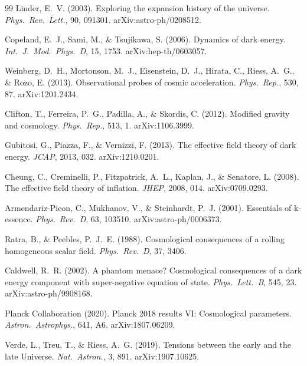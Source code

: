 \documentclass[12pt,a4paper]{article}
\begin{document}
\begin{thebibliography}{99}
  Linder, E.~V. (2003).
  Exploring the expansion history of the universe.
  \textit{Phys.\ Rev.\ Lett.}, 90, 091301.
  arXiv:astro-ph/0208512.

  Copeland, E.~J., Sami, M., \& Tsujikawa, S. (2006).
  Dynamics of dark energy.
  \textit{Int.\ J.\ Mod.\ Phys.\ D}, 15, 1753.
  arXiv:hep-th/0603057.

  Weinberg, D.~H., Mortonson, M.~J., Eisenstein, D.~J., Hirata, C.,
  Riess, A.~G., \& Rozo, E. (2013).
  Observational probes of cosmic acceleration.
  \textit{Phys.\ Rep.}, 530, 87.
  arXiv:1201.2434.

  Clifton, T., Ferreira, P.~G., Padilla, A., \& Skordis, C. (2012).
  Modified gravity and cosmology.
  \textit{Phys.\ Rep.}, 513, 1.
  arXiv:1106.3999.

  Gubitosi, G., Piazza, F., \& Vernizzi, F. (2013).
  The effective field theory of dark energy.
  \textit{JCAP}, 2013, 032.
  arXiv:1210.0201.

  Cheung, C., Creminelli, P., Fitzpatrick, A.~L., Kaplan, J., \& Senatore, L.
  (2008).
  The effective field theory of inflation.
  \textit{JHEP}, 2008, 014.
  arXiv:0709.0293.

  Armendariz-Picon, C., Mukhanov, V., \& Steinhardt, P.~J. (2001).
  Essentials of k-essence.
  \textit{Phys.\ Rev.\ D}, 63, 103510.
  arXiv:astro-ph/0006373.

  Ratra, B., \& Peebles, P.~J.~E. (1988).
  Cosmological consequences of a rolling homogeneous scalar field.
  \textit{Phys.\ Rev.\ D}, 37, 3406.

  Caldwell, R.~R. (2002).
  A phantom menace? Cosmological consequences of a dark energy component with
  super-negative equation of state.
  \textit{Phys.\ Lett.\ B}, 545, 23.
  arXiv:astro-ph/9908168.

  Planck Collaboration (2020).
  Planck 2018 results VI: Cosmological parameters.
  \textit{Astron.\ Astrophys.}, 641, A6.
  arXiv:1807.06209.

  Verde, L., Treu, T., \& Riess, A.~G. (2019).
  Tensions between the early and the late Universe.
  \textit{Nat.\ Astron.}, 3, 891.
  arXiv:1907.10625.


\end{thebibliography}
\end{document}
